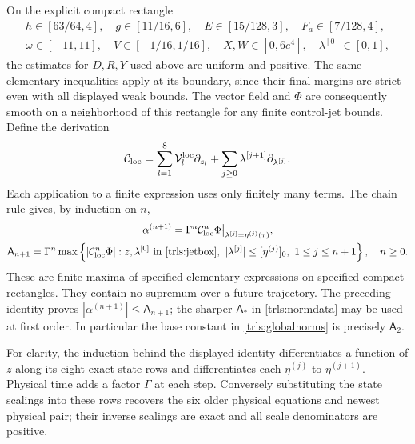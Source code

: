 On the explicit compact rectangle
\begin{equation}\label{trls:jetbox}
 \begin{gathered}
 h\in[63/64,4],\quad g\in[11/16,6],\quad
 E\in[15/128,3],\quad F_a\in[7/128,4],\\
 \omega\in[-11,11],\quad V\in[-1/16,1/16],\quad
 X,W\in[0,6e^4],\quad \lambda^{[0]}\in[0,1],
 \end{gathered}
\end{equation}
the estimates for $D,R,Y$ used above are uniform and positive.
The same elementary inequalities apply at its boundary, since their
final margins are strict even with all displayed weak bounds.
The vector field and $\Phi$ are consequently smooth on a
neighborhood of this rectangle for any finite control-jet bounds.
Define the derivation
\begin{equation}\label{trls:jetderivation}
 \mathcal C_{\rm loc}
 =\sum_{l=1}^8\mathcal V_l^{\rm loc}
                   \partial_{z_l}
   +\sum_{j\geq0}\lambda^{[j+1]}
                   \partial_{\lambda^{[j]}}.
\end{equation}
Each application to a finite expression uses only finitely many
terms. The chain rule gives, by induction on $n$,
\begin{equation}\label{trls:controljets}
 \begin{gathered}
 \alpha^{(n+1)}=
       \Gamma^n\mathcal C_{\rm loc}^n\Phi
       \big|_{\lambda^{[j]}=\eta^{(j)}(\tau)},\\
 \mathsf A_{n+1}=\Gamma^n\max
 \left\{|\mathcal C_{\rm loc}^n\Phi|:
    z,\lambda^{[0]}\text{ in \eqref{trls:jetbox}},
    \ |\lambda^{[j]}|\leq[\eta^{(j)}]_0,
                            \ 1\leq j\leq n+1\right\},\quad n\geq0.
 \end{gathered}
\end{equation}
These are finite maxima of specified elementary expressions on
specified compact rectangles. They contain no supremum over a
future trajectory. The preceding identity proves
$|\alpha^{(n+1)}|\leq\mathsf A_{n+1}$; the sharper
$\mathsf A_*$ in \eqref{trls:normdata} may be used at first
order. In particular the base constant in
\eqref{trls:globalnorms} is precisely $\mathsf A_2$.

For clarity, the induction behind the displayed identity differentiates
a function of $z$ along its eight exact state rows and differentiates
each $\eta^{(j)}$ to $\eta^{(j+1)}$. Physical time
adds a factor $\Gamma$ at each step. Conversely substituting
the state scalings into these rows recovers the six older physical
equations and newest physical pair; their inverse scalings are
exact and all scale denominators are positive.

